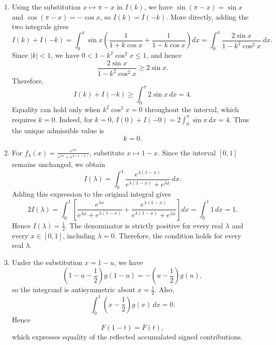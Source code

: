 \documentclass[11pt,a4paper]{article}
\begin{document}
\begin{enumerate}
For each fixed $x$, the function $|x-c|$ is convex in $c$. Since $w(x)>0$, the integral $F(c)$ is convex on $[0,1]$. Therefore, by symmetry and convexity,
\[
F\left(\frac12\right)=F\left(\frac{c+(1-c)}2\right)\le \frac{F(c)+F(1-c)}2=F(c).
\]
Hence the minimum occurs at $c=\frac12$. The strict positivity of the weight makes the minimizer unique.
\item Using the substitution $x\mapsto \pi-x$ in $I(k)$, we have $\sin(\pi-x)=\sin x$ and $\cos(\pi-x)=-\cos x$, so $I(k)=I(-k)$. More directly, adding the two integrals gives
\[
I(k)+I(-k)=\int_0^\pi \sin x\left(\frac{1}{1+k\cos x}+\frac{1}{1-k\cos x}\right)dx
=\int_0^\pi \frac{2\sin x}{1-k^2\cos^2x}\,dx.
\]
Since $|k|<1$, we have $0<1-k^2\cos^2x\le 1$, and hence
\[
\frac{2\sin x}{1-k^2\cos^2x}\ge 2\sin x.
\]
Therefore,
\[
I(k)+I(-k)\ge \int_0^\pi 2\sin x\,dx=4.
\]
Equality can hold only when $k^2\cos^2x=0$ throughout the interval, which requires $k=0$. Indeed, for $k=0$, $I(0)+I(-0)=2\int_0^\pi\sin x\,dx=4$. Thus the unique admissible value is
\[
\boxed{k=0}.
\]
\item For $f_\lambda(x)=\frac{e^{\lambda x}}{e^{\lambda x}+e^{\lambda(1-x)}}$, substitute $x\mapsto 1-x$. Since the interval $[0,1]$ remains unchanged, we obtain
\[
I(\lambda)=\int_0^1\frac{e^{\lambda(1-x)}}{e^{\lambda(1-x)}+e^{\lambda x}}\,dx.
\]
Adding this expression to the original integral gives
\[
2I(\lambda)=\int_0^1\left[\frac{e^{\lambda x}}{e^{\lambda x}+e^{\lambda(1-x)}}+\frac{e^{\lambda(1-x)}}{e^{\lambda(1-x)}+e^{\lambda x}}\right]dx
=\int_0^1 1\,dx=1.
\]
Hence $I(\lambda)=\frac12$. The denominator is strictly positive for every real $\lambda$ and every $x\in[0,1]$, including $\lambda=0$. Therefore, the condition holds for every real $\lambda$.
\item Under the substitution $x=1-u$, we have
\[
\left(1-u-\frac12\right)g(1-u)=-\left(u-\frac12\right)g(u),
\]
so the integrand is antisymmetric about $x=\frac12$. Also,
\[
\int_0^1\left(x-\frac12\right)g(x)\,dx=0.
\]
Hence
\[
F(1-t)=F(t),
\]
which expresses equality of the reflected accumulated signed contributions.


\end{enumerate}
\end{document}
